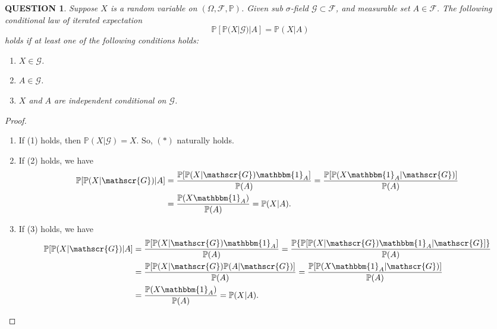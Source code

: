 \documentclass[12pt]{article}
\renewcommand{\(}{\left(}%
\renewcommand{\)}{\right)}%
\renewcommand{\[}{\left[}%
\renewcommand{\]}{\right]}%
\newcommand{\p}{\mathbb{P}}
\newcommand{\f}{\mathscr{F}}
\newcommand{\g}{\mathscr{G}}
\newtheorem{question}{QUESTION}[section]}
\newtheorem{proof}{Proof.}}
\begin{document}
  \begin{question}
  	Suppose $X$ is a random variable on $(\Omega,\f,\p)$. Given sub $\sigma$-field $\g\subset\f$, and measurable set $A\in\f$. The following conditional law of iterated expectation 
  	\begin{equation*}
  		\p[\p(X|\g)|A]=\p(X|A)\tag{$*$}
  	\end{equation*}
  	holds if at least one of the following conditions holds:
  	\begin{enumerate}[(1)]
  		\item $X\in\g$.
  		\item $A\in\g$.
  		\item $X$ and $A$ are independent conditional on $\g$.
  	\end{enumerate}
  \end{question}
  \begin{proof}
  	\begin{enumerate}
  		\item If (1) holds, then $\p(X|\g)=X$. So, $(*)$ naturally holds.
  		\item If (2) holds, we have
  		\begin{equation*}
  			\begin{split}
  				\p[\p(X|\g)|A]&=\frac{\p[\p(X|\g)\mathbbm{1}_A]}{\p(A)}=\frac{\p[\p(X\mathbbm{1}_A|\g)]}{\p(A)}\\
  				&=\frac{\p(X\mathbbm{1}_A)}{\p(A)}=\p(X|A).
  			\end{split}
  		\end{equation*}
  		\item If (3) holds, we have
  		\begin{equation*}
  			\begin{split}
  				\p[\p(X|\g)|A]&=\frac{\p[\p(X|\g)\mathbbm{1}_A]}{\p(A)}=\frac{\p\{\p[\p(X|\g)\mathbbm{1}_A|\g]\}}{\p(A)}\\
  				&=\frac{\p[\p(X|\g)\p(A|\g)]}{\p(A)}=\frac{\p[\p(X\mathbbm{1}_A |\g)]}{\p(A)}\\
  				&=\frac{\p(X\mathbbm{1}_A)}{\p(A)}=\p(X|A).
  			\end{split}
  		\end{equation*} 
  	\end{enumerate}
  \end{proof}
  
\end{document}
